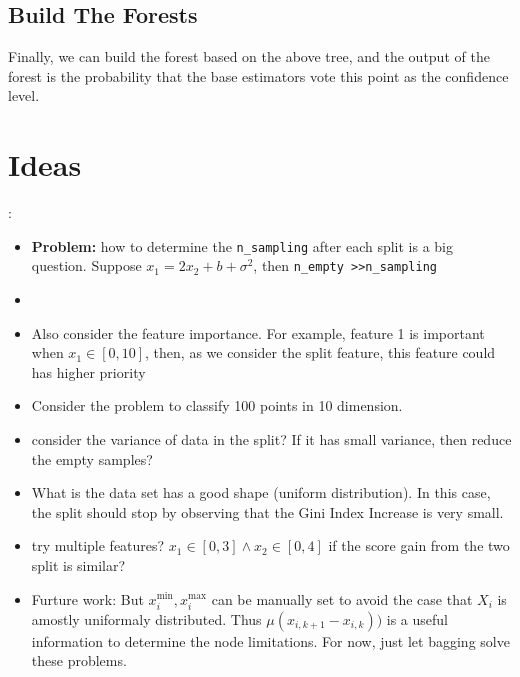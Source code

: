 \documentclass[11pt,onecolumn]{IEEEtran}
\begin{document}
\subsection{Build The Forests}
Finally, we can build the forest based on the above tree, and the output of the forest is the probability that the base estimators vote this point as the confidence level.





\section{Ideas}:
\begin{itemize}
 \item \textbf{Problem:} how to determine the \texttt{n\_sampling}  after each split is a big question.  Suppose $x_1=2 x_2+b+\sigma^2$, then \texttt{n\_empty >>n\_sampling} \item 

	\item  Also consider the feature importance. For example, feature 1 is important when $x_1\in[0,10]$, then, as we consider the split feature, this feature could has higher priority
	\item Consider the problem to classify 100 points in 10 dimension.
    \item consider the variance of data in the split?  If it has small variance, then reduce the empty samples?
    \item What is the data set has a good shape (uniform distribution). In this case, the split should stop by observing that the Gini Index Increase is very small.
    \item try multiple features?  $x_1\in [0,3]\wedge x_2\in [0,4]$ if the score gain from the two split is similar?
    \item  Furture work:  But $x_i^{\mbox{min}},x_i^{\mbox{max}}$ can be manually set to avoid the case that $X_i$ is amostly uniformaly distributed. Thus $\mu(x_{i,k+1}-x_{i,k}))$ is a useful information to determine the node limitations. For now, just let bagging solve these problems.
\end{itemize}


\end{document}
